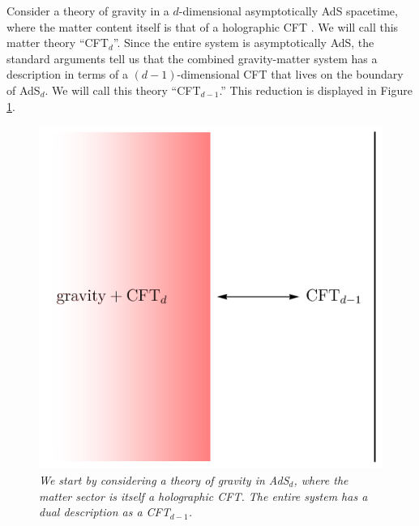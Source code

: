 \documentclass[12pt]{article}
\begin{document}
Consider a theory of gravity in a $d$-dimensional asymptotically AdS spacetime, where the matter content itself is that of a holographic CFT \cite{Almheiri:2019psf}.   We will call this matter theory  ``CFT$_d$''.
Since the entire system is asymptotically AdS, the standard arguments tell us that the combined gravity-matter system has a description in terms of a $(d-1)$-dimensional CFT that lives on the boundary of AdS$_d$. We will call this theory ``CFT$_{d-1}$.''  This reduction is displayed in Figure \ref{figholographicrest1}.
\begin{figure}[!ht]
\begin{center}
\includegraphics[height=0.4\textheight]{boundaryreduction.pdf}
\caption{\em We start by considering a theory of gravity in AdS$_d$, where the matter sector is itself a holographic CFT. The entire system has a dual description as a CFT$_{d-1}$. \label{figholographicrest1}}
\end{center}
\end{figure}
\end{document}
